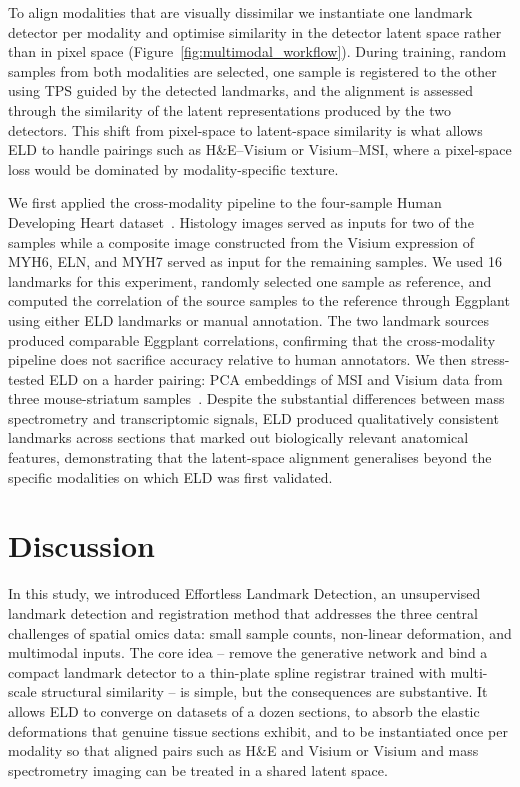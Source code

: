 \documentclass[11pt]{article}
\begin{document}
To align modalities that are visually dissimilar we instantiate one landmark detector per modality and optimise similarity in the detector latent space rather than in pixel space (Figure~\ref{fig:multimodal_workflow}). During training, random samples from both modalities are selected, one sample is registered to the other using TPS guided by the detected landmarks, and the alignment is assessed through the similarity of the latent representations produced by the two detectors. This shift from pixel-space to latent-space similarity is what allows ELD to handle pairings such as H\&E--Visium or Visium--MSI, where a pixel-space loss would be dominated by modality-specific texture.

We first applied the cross-modality pipeline to the four-sample Human Developing Heart dataset~\cite{asp2019spatiotemporal}. Histology images served as inputs for two of the samples while a composite image constructed from the Visium expression of MYH6, ELN, and MYH7 served as input for the remaining samples. We used 16 landmarks for this experiment, randomly selected one sample as reference, and computed the correlation of the source samples to the reference through Eggplant using either ELD landmarks or manual annotation. The two landmark sources produced comparable Eggplant correlations, confirming that the cross-modality pipeline does not sacrifice accuracy relative to human annotators. We then stress-tested ELD on a harder pairing: PCA embeddings of MSI and Visium data from three mouse-striatum samples~\cite{vicari2024spatial}. Despite the substantial differences between mass spectrometry and transcriptomic signals, ELD produced qualitatively consistent landmarks across sections that marked out biologically relevant anatomical features, demonstrating that the latent-space alignment generalises beyond the specific modalities on which ELD was first validated.

\section{Discussion}

In this study, we introduced Effortless Landmark Detection, an unsupervised landmark detection and registration method that addresses the three central challenges of spatial omics data: small sample counts, non-linear deformation, and multimodal inputs. The core idea -- remove the generative network and bind a compact landmark detector to a thin-plate spline registrar trained with multi-scale structural similarity -- is simple, but the consequences are substantive. It allows ELD to converge on datasets of a dozen sections, to absorb the elastic deformations that genuine tissue sections exhibit, and to be instantiated once per modality so that aligned pairs such as H\&E and Visium or Visium and mass spectrometry imaging can be treated in a shared latent space.
\end{document}
